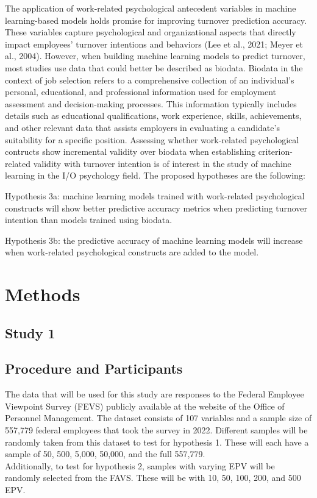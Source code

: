 \documentclass[
  man]{apa7}
\begin{document}
The application of work-related psychological antecedent variables in machine learning-based models holds promise for improving turnover prediction accuracy.
These variables capture psychological and organizational aspects that directly impact employees' turnover intentions and behaviors (Lee et al., 2021; Meyer et al., 2004). However, when building machine learning models to predict turnover, most studies use data that could better be described as biodata. Biodata in the context of job selection refers to a comprehensive collection of an individual's personal, educational, and professional information used for employment assessment and decision-making processes. This information typically includes details such as educational qualifications, work experience, skills, achievements, and other relevant data that assists employers in evaluating a candidate's suitability for a specific position.
Assessing whether work-related psychological contructs show incremental validity over biodata when establishing criterion-related validity with turnover intention is of interest in the study of machine learning in the I/O psychology field.
The proposed hypotheses are the following:

Hypothesis 3a: machine learning models trained with work-related psychological constructs will show better predictive accuracy metrics when predicting turnover intention than models trained using biodata.

Hypothesis 3b: the predictive accuracy of machine learning models will increase when work-related psychological constructs are added to the model.

\hypertarget{methods}{%
\section{Methods}\label{methods}}

\hypertarget{study-1}{%
\subsection{Study 1}\label{study-1}}

\hypertarget{procedure-and-participants}{%
\subsection{Procedure and Participants}\label{procedure-and-participants}}

The data that will be used for this study are responses to the Federal Employee Viewpoint Survey (FEVS) publicly available at the website of the Office of Personnel Management.
The dataset consists of 107 variables and a sample size of 557,779 federal employees that took the survey in 2022. Different samples will be randomly taken from this dataset to test for hypothesis 1. These will each have a sample of 50, 500, 5,000, 50,000, and the full 557,779.\\
Additionally, to test for hypothesis 2, samples with varying EPV will be randomly selected from the FAVS. These will be with 10, 50, 100, 200, and 500 EPV.
\end{document}
